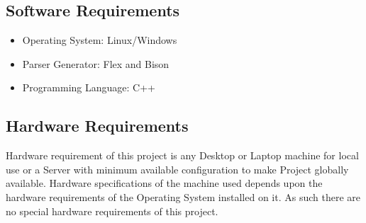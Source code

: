 
\subsection{Software Requirements}

\begin{itemize}
\item Operating System: Linux/Windows
\item Parser Generator: Flex and Bison
\item Programming Language: C++
\end{itemize}

\subsection{Hardware Requirements}
Hardware requirement of this project is any Desktop or Laptop machine for local
use or a Server with minimum available configuration to make Project globally
available. Hardware specifications of the machine used depends upon the hardware
requirements of the Operating System installed on it. As such there are no special
hardware requirements of this project.\\
